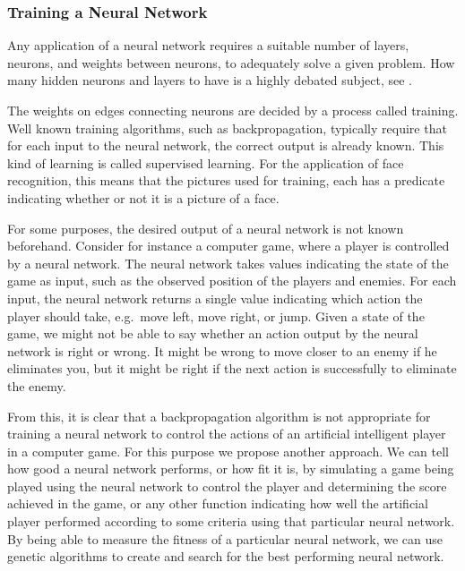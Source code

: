 \subsubsection{Training a Neural Network}
Any applica\-tion of a neural network requires a suitable number of layers, neurons, and weights between neurons, to adequately solve a given problem. How many hidden neurons and layers to have is a highly debated subject, see \cite{sarle1997}.

The weights on edges connecting neurons are decided by a process called training. Well known training algorithms, such as backpropagation, typically require that for each input to the neural network, the correct output is already known. This kind of learning is called supervised learning. For the application of face recognition, this means that the pictures used for training, each has a predicate indicating whether or not it is a picture of a face.

For some purposes, the desired output of a neural network is not known beforehand. Consider for instance a computer game, where a player is controlled by a neural network. The neural network takes values indicating the state of the game as input, such as the observed position of the players and enemies. For each input, the neural network returns a single value indicating which action the player should take, e.g.\ move left, move right, or jump. Given a state of the game, we might not be able to say whether an action output by the neural network is right or wrong. It might be wrong to move closer to an enemy if he eliminates you, but it might be right if the next action is successfully to eliminate the enemy.

From this, it is clear that a backpropagation algorithm is not appropriate for training a neural network to control the actions of an artificial intelligent player in a computer game. For this purpose we propose another approach. We can tell how good a neural network performs, or how fit it is, by simulating a game being played using the neural network to control the player and determining the score achieved in the game, or any other function indicating how well the artificial player performed according to some criteria using that particular neural network. By being able to measure the fitness of a particular neural network, we can use genetic algorithms to create and search for the best performing neural network.
